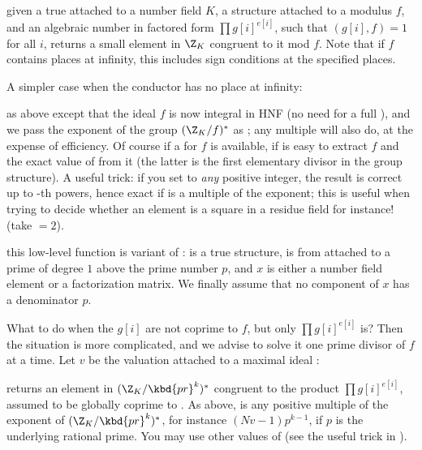 given a true  attached to a number field $K$, a  structure
attached to a modulus $f$, and an algebraic number in factored form $\prod
g[i]^{e[i]}$, such that $(g[i],f) = 1$ for all $i$, returns a small element in
$\Z_K$ congruent to it mod $f$. Note that if $f$ contains places at infinity,
this includes sign conditions at the specified places.

A simpler case when the conductor has no place at infinity:

as above except that the ideal $f$ is now integral in HNF (no need for a full
), and we pass the exponent of the group $(\Z_K/f)^*$ as ;
any multiple will also do, at the expense of efficiency. Of course if a
 for $f$ is available, if is easy to extract $f$ and the exact value
of  from it (the latter is the first elementary divisor in the
group structure). A useful trick: if you set  to \emph{any}
positive integer, the result is correct up to -th powers, hence
exact if  is a multiple of the exponent; this is useful when trying
to decide whether an element is a square in a residue field for instance!
(take $ = 2$).

 this low-level function
is variant of
:  is a true  structure,
 is from  attached to a prime of degree $1$ above
the prime number $p$, and $x$ is either a number field element or a
 factorization matrix. We finally assume that no component of $x$
has a denominator $p$.

What to do when the $g[i]$ are not coprime to $f$, but only $\prod
g[i]^{e[i]}$ is? Then the situation is more complicated, and we advise to
solve it one prime divisor of $f$ at a time. Let $v$ be the valuation
attached to a maximal ideal :

returns an element in $(\Z_K/\kbd{pr}^k)^*$ congruent to the product
$\prod g[i]^{e[i]}$, assumed to be globally coprime to . As above,
 is any positive multiple of the exponent of $(\Z_K/\kbd{pr}^k)^*$,
for instance $(Nv-1)p^{k-1}$, if $p$ is the underlying rational prime. You
may use other values of  (see the useful trick in
).

